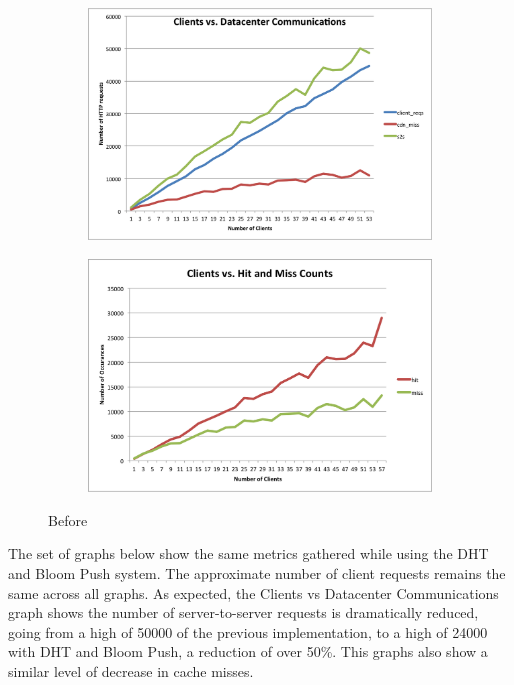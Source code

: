 \documentclass[conference]{IEEEtran}
\begin{document}
\begin{figure}[!h]
	\centering
	\begin{subfigure}[b]{0.49\columnwidth}
		\centering
		\includegraphics[width=\columnwidth]{figures/client-server.png}
	\end{subfigure}
	\begin{subfigure}[b]{0.49\columnwidth}
		\centering
		\includegraphics[width=\columnwidth]{figures/hit_miss_separate.png}
	\end{subfigure}
	\caption{Before}
\end{figure}

The set of graphs below show the same metrics gathered while using the DHT and Bloom Push system. The approximate number of client requests remains the same across all graphs. As expected, the Clients vs Datacenter Communications graph shows the number of server-to-server requests is dramatically reduced, going from a high of 50000 of the previous implementation, to a high of 24000 with DHT and Bloom Push, a reduction of over 50\%. This graphs also show a similar level of decrease in cache misses. 
\end{document}
